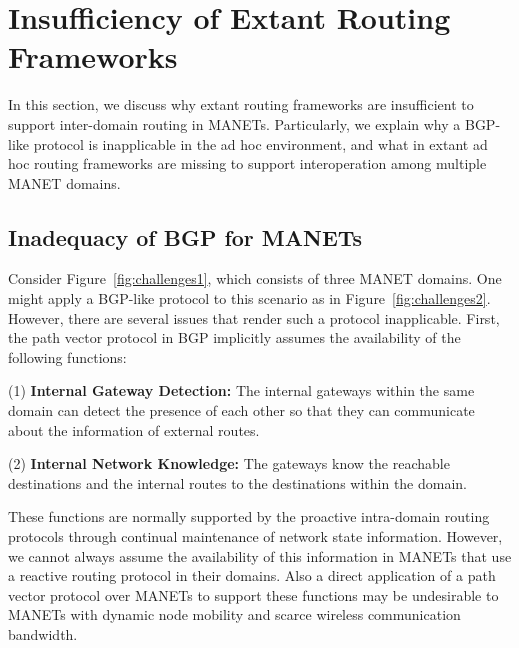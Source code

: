 

\section{Insufficiency of Extant Routing Frameworks}
\label{sec::related}


In this section, we discuss why extant routing frameworks are insufficient to support inter-domain routing in MANETs. Particularly, we explain why a BGP-like protocol is inapplicable in the ad hoc environment, and what in extant ad hoc routing frameworks are missing to support interoperation among multiple MANET domains.


\subsection{Inadequacy of BGP for MANETs}
Consider Figure~\ref{fig:challenges1}, which consists of three MANET domains. 
One might apply a BGP-like protocol to this scenario as in Figure~\ref{fig:challenges2}. However, there are several issues that render such a protocol inapplicable. First, the path vector protocol in BGP implicitly assumes the availability of the following functions:

\noindent
(1) {\bf Internal Gateway Detection:} The internal gateways within the same domain can detect the presence of each other so that they can communicate about the information of external routes. 

\noindent
(2) {\bf Internal Network Knowledge:} The gateways know the reachable destinations and the internal routes to the destinations within the domain.


These functions are normally supported by the proactive intra-domain routing protocols through continual maintenance of network state information. However, we cannot always assume the availability of this information in MANETs that use a reactive routing protocol in their domains. Also a direct application of a path vector protocol over MANETs to support these functions may be undesirable to MANETs with dynamic node mobility and scarce wireless communication bandwidth.

